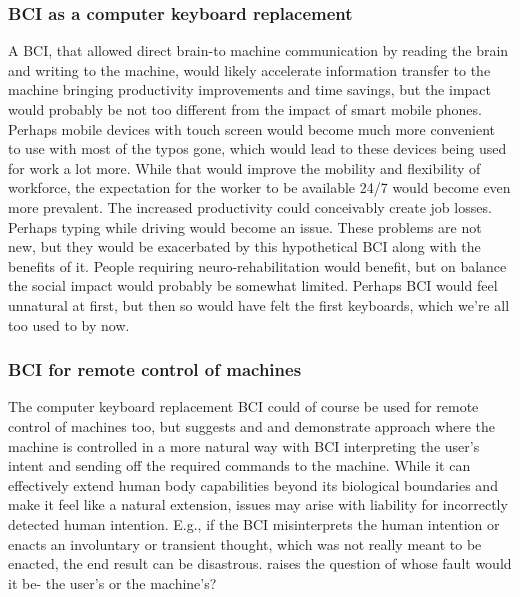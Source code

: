 \documentclass[fleqn,11pt]{olplainarticle}
\begin{document}
\subsubsection{BCI as a computer keyboard replacement}
A BCI, that allowed direct brain-to machine communication by reading the brain and writing to the machine, would likely accelerate information transfer to the machine \cite{schalk2008brain} bringing productivity improvements and time savings, but the impact would probably be not too different from the impact of smart mobile phones. Perhaps mobile devices with touch screen would become much more convenient to use with most of the typos gone, which would lead to these devices being used for work a lot more. While that would improve the mobility and flexibility of workforce, the expectation for the worker to be available 24/7 would become even more prevalent. The increased productivity could conceivably create job losses. Perhaps typing while driving would become an issue. These problems are not new, but they would be exacerbated by this hypothetical BCI along with the benefits of it. People requiring neuro-rehabilitation would benefit, but on balance the social impact would probably be somewhat limited. Perhaps BCI would feel unnatural at first, but then so would have felt the first keyboards, which we're all too used to by now.

\subsubsection{BCI for remote control of machines}
The computer keyboard replacement BCI could of course be used for remote control of machines too, but \cite{schalk2008brain} suggests and \cite{warwick2003cyborg} and \cite{wakefield_2020} demonstrate approach where the machine is controlled in a more natural way with BCI interpreting the user's intent and sending off the required commands to the machine. While it can effectively extend human body capabilities beyond its biological boundaries and make it feel like a natural extension, issues may arise with liability for incorrectly detected human intention. E.g., if the BCI misinterprets the human intention or enacts an involuntary or transient thought, which was not really meant to be enacted, the end result can be disastrous. \cite{schalk2008brain} raises the question of whose fault would it be- the user's or the machine's? 
\end{document}
